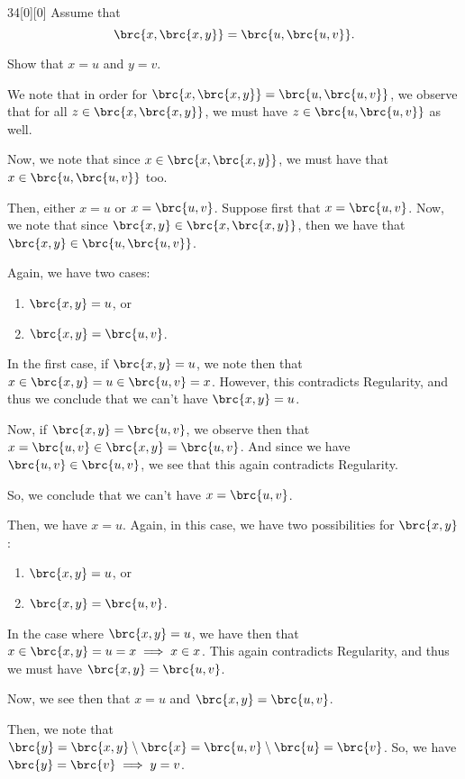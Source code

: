 \documentclass{article}
\begin{document}
\begin{hw}{34}[0][0]
	Assume that
	\begin{equation*}
		\brc{x, \brc{x, y}} = \brc{u, \brc{u, v}}.
	\end{equation*}

	Show that $x = u$ and $y = v$.
\end{hw}
\begin{solution}
	We note that in order for $\brc{x, \brc{x, y}} = \brc{u, \brc{u, v}}$, we observe that for all $z \in \brc{x, \brc{x, y}}$, we must have $z \in \brc{u, \brc{u, v}}$ as well.
	
	Now, we note that since $x \in \brc{x, \brc{x, y}}$, we must have that $x \in \brc{u, \brc{u, v}}$ too.
	
	Then, either $x = u$ or $x = \brc{u, v}$. Suppose first that $x = \brc{u, v}$. Now, we note that since $\brc{x, y} \in \brc{x, \brc{x, y}}$, then we have that $\brc{x, y} \in \brc{u, \brc{u, v}}$.
	
	Again, we have two cases:
	\begin{enumerate}
		\item $\brc{x, y} = u$, or
		\item $\brc{x, y} = \brc{u, v}$.
	\end{enumerate}

	In the first case, if $\brc{x, y} = u$, we note then that $x \in \brc{x, y} = u \in \brc{u, v} = x$. However, this contradicts Regularity, and thus we conclude that we can't have $\brc{x, y} = u$.
	
	Now, if $\brc{x, y} = \brc{u, v}$, we observe then that $x = \brc{u, v} \in \brc{x, y} = \brc{u, v}$. And since we have $\brc{u, v} \in \brc{u, v}$, we see that this again contradicts Regularity.
	
	So, we conclude that we can't have $x = \brc{u, v}$.
	
	Then, we have $x = u$. Again, in this case, we have two possibilities for $\brc{x, y}$:
	\begin{enumerate}
		\item $\brc{x, y} = u$, or
		\item $\brc{x, y} = \brc{u, v}$.
	\end{enumerate}

	In the case where $\brc{x, y} = u$, we have then that $x \in \brc{x, y} = u = x \implies x \in x$. This again contradicts Regularity, and thus we must have $\brc{x, y} = \brc{u, v}$.
	
	Now, we see then that $x = u$ and $\brc{x, y} = \brc{u, v}$.
	
	Then, we note that $\brc{y} = \brc{x, y} \setminus \brc{x} = \brc{u, v} \setminus \brc{u} = \brc{v}$. So, we have $\brc{y} = \brc{v} \implies y = v$.
\end{solution}
\end{document}
